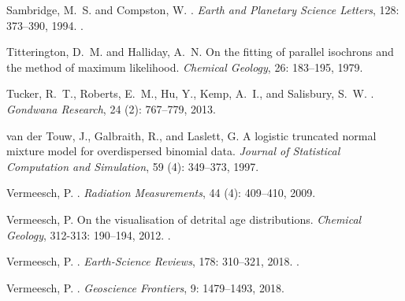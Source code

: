 \documentclass{article}
\begin{document}
\begin{thebibliography}{32}
{Sambridge}, M.~S. and {Compston}, W.
.
\newblock \emph{Earth and Planetary Science Letters}, 128: 373--390,
  1994.
\newblock {}.

Titterington, D.~M. and Halliday, A.~N.
\newblock On the fitting of parallel isochrons and the method of maximum
  likelihood.
\newblock \emph{Chemical Geology}, 26: 183--195, 1979.

Tucker, R.~T., Roberts, E.~M., Hu, Y., Kemp, A.~I., and Salisbury, S.~W.
.
\newblock \emph{Gondwana Research}, 24 (2): 767--779, 2013.

{van der Touw}, J., Galbraith, R., and Laslett, G.
\newblock A logistic truncated normal mixture model for overdispersed binomial
  data.
\newblock \emph{Journal of Statistical Computation and Simulation}, 59
  (4): 349--373, 1997.

Vermeesch, P.
.
\newblock \emph{Radiation Measurements}, 44 (4): 409--410,
  2009.

Vermeesch, P.
\newblock On the visualisation of detrital age distributions.
\newblock \emph{Chemical Geology}, 312-313: 190--194, 2012.
\newblock {}.

Vermeesch, P.
.
\newblock \emph{Earth-Science Reviews}, 178: 310--321,
  2018{}.
\newblock {}.

Vermeesch, P.
.
\newblock \emph{Geoscience Frontiers}, 9: 1479--1493,
  2018{}.


\end{thebibliography}
\end{document}
